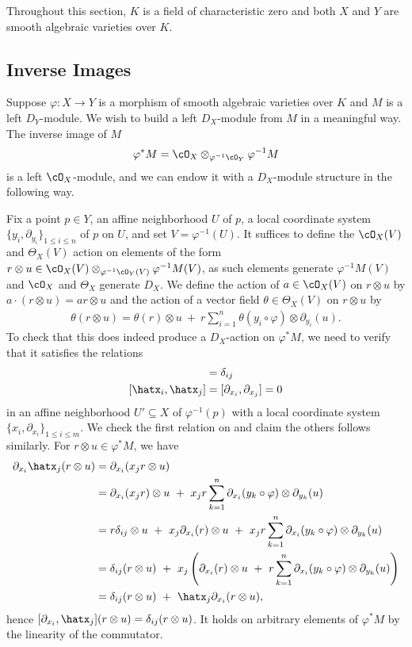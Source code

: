 Throughout this section, $K$ is a field of characteristic zero and both $X$ and $Y$ are smooth algebraic varieties over $K$. 

\subsection{Inverse Images}
Suppose $\varphi:X\to Y$ is a morphism of smooth algebraic varieties over $K$ and $M$ is a left $D_Y$-module. We wish to build a left $D_X$-module from $M$ in a meaningful way. The inverse image of $M$
\begin{align*}
	\varphi^*M = \cO_X \otimes_{\varphi^{-1}\cO_Y} \varphi^{-1}M
\end{align*}
is a left $\cO_X$-module, and we can endow it with a $D_X$-module structure in the following way.

Fix a point $p \in Y$, an affine neighborhood $U$ of $p$, a local coordinate system $\{y_i,\partial_{y_i}\}_{1\leq i\leq n}$ of $p$ on $U$, and set $V = \varphi^{-1}(U)$. It suffices to define the $\cO_X(V)$ and $\Theta_X(V)$ action on elements of the form $r \otimes u \in \cO_X(V) \otimes_{\varphi^{-1}\cO_Y(V)} \varphi^{-1}M(V)$, as such elements generate $\varphi^{-1}M(V)$ and $\cO_X$ and $\Theta_X$ generate $D_X$. We define the action of $a \in \cO_X(V)$ on $r\otimes u$ by $a\cdot (r\otimes u) = ar\otimes u$ and the action of a vector field $\theta \in \Theta_X(V)$ on $r \otimes u$ by
\begin{align*}\label{eqn:inv-img-action}\tag{$\ast$}
	\theta(r \otimes u) = \theta(r)\otimes u ~+~ r\sum_{i=1}^n \theta(y_i \circ \varphi) \otimes \partial_{y_i}(u).
\end{align*}
To check that this does indeed produce a $D_X$-action on $\varphi^*M$, we need to verify that it satisfies the relations
\begin{align*}
	[\partial_{x_i},\hatx_j] &= \delta_{ij} \\
	[\hatx_i,\hatx_j] &= [\partial_{x_i},\partial_{x_j}] = 0
\end{align*}
in an affine neighborhood $U'\subseteq X$ of $\varphi^{-1}(p)$ with a local coordinate system $\{x_i,\partial_{x_i}\}_{1\leq i\leq m}$. We check the first relation on and claim the others follows similarly. For $r\otimes u \in \varphi^*M$, we have
\begin{align*}
	\partial_{x_i}\hatx_j(r\otimes u) 
		&= \partial_{x_i}(x_jr\otimes u) \\
		&= \partial_{x_i}(x_jr) \otimes u ~+~ x_jr\sum_{k=1}^n \partial_{x_i}(y_k \circ \varphi)\otimes \partial_{y_k}(u) \\
		&= r\delta_{ij}\otimes u ~+~ x_j \partial_{x_i}(r)\otimes u ~+~ x_jr\sum_{k=1}^n \partial_{x_i}(y_k \circ \varphi)\otimes \partial_{y_k}(u) \\
		&= \delta_{ij}(r\otimes u) ~+~ x_j\left(\partial_{x_i}(r) \otimes u ~+~ r\sum_{k=1}^n \partial_{x_i}(y_k \circ \varphi)\otimes \partial_{y_k}(u)\right) \\
		&= \delta_{ij}(r\otimes u) ~+~ \hatx_j\partial_{x_i}(r\otimes u),
\end{align*}
hence $[\partial_{x_i}, \hatx_j](r\otimes u) = \delta_{ij}(r\otimes u)$. It holds on arbitrary elements of $\varphi^*M$ by the linearity of the commutator.

